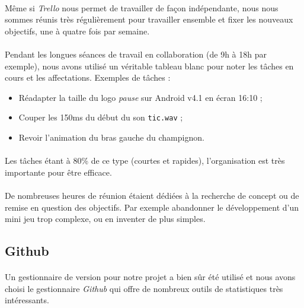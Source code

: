 \paragraph{}
Même si \textit{Trello} nous permet de travailler de façon indépendante, nous nous sommes réunis très régulièrement pour travailler ensemble et fixer les nouveaux objectifs, une à quatre fois par semaine.
 
\paragraph{}
Pendant les longues séances de travail en collaboration (de 9h à 18h par exemple), nous avons utilisé un véritable tableau blanc pour noter les tâches en cours et les affectations. Exemples de tâches :
 
\begin{itemize}
\item Réadapter la taille du logo \textit{pause} sur Android v4.1 en écran 16:10 ;
\item Couper les 150ms du début du son \texttt{tic.wav} ;
\item Revoir l’animation du bras gauche du champignon.
\end{itemize}
 
\paragraph{}
Les tâches étant à 80\% de ce type (courtes et rapides), l’organisation est très importante pour être efficace.
 
\paragraph{}
De nombreuses heures de réunion étaient dédiées à la recherche de concept ou de remise en question des objectifs. Par exemple abandonner le développement d’un mini jeu trop complexe, ou en inventer de plus simples.

\subsection{Github}
 
\paragraph{}
Un gestionnaire de version pour notre projet a bien sûr été utilisé et nous avons choisi le gestionnaire \emph{Github} qui offre de nombreux outils de statistiques très intéressants.
 
